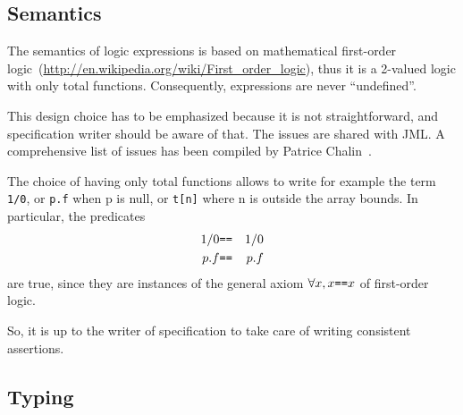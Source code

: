 \documentclass[a4paper,11pt,twoside,openright]{report}
\begin{document}
\subsection{Semantics}
\label{sec:twovaluedlogic}

The semantics of logic expressions is based on
mathematical first-order
logic~(\url{http://en.wikipedia.org/wiki/First_order_logic}), thus it
is a 2-valued logic with only total functions. Consequently,
expressions are never ``undefined''.

This design choice has to be emphasized because it is not
straightforward, and specification writer should be aware of that. The
issues are shared with JML. A comprehensive list of issues has been
compiled by Patrice Chalin~\cite{chalin05ftfjp,chalin07icse}.

The choice of having only total functions allows to write for example
the term \verb|1/0|, or \verb|p.f| when p is null, or \verb|t[n]|
where n is outside the array bounds. In
particular, the predicates
\begin{eqnarray*}
  1/0 &\verb|==|& 1/0 \\\relax
  p.f &\verb|==|& p.f
\end{eqnarray*}
are true, since they are instances of the general axiom $\forall x,
x\verb|==|x$ of first-order logic.

So, it is up to the writer of specification to take care of writing
consistent assertions.

\subsection{Typing}
\end{document}
